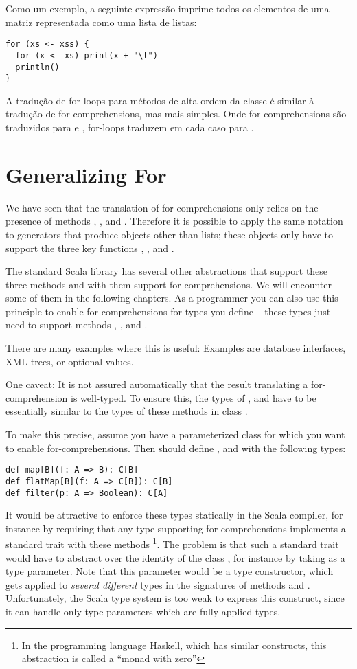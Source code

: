 Como um exemplo, a seguinte expressão imprime todos os elementos de uma matriz representada como 
uma lista de listas:
 \begin{lstlisting}
for (xs <- xss) {
  for (x <- xs) print(x + "\t")
  println()
}
\end{lstlisting}
A tradução de for-loops para métodos de alta ordem da classe  é similar à tradução de
for-comprehensions, mas mais simples. Onde for-comprehensions são traduzidos para  e 
, for-loops traduzem em cada caso para .

\section{Generalizing For}

We have seen that the translation of for-comprehensions only relies on
the presence of methods , , and
. Therefore it is possible to apply the same notation to
generators that produce objects other than lists; these objects only
have to support the three key functions , ,
and .

The standard Scala library has several other abstractions that support
these three methods and with them support for-comprehensions. We will
encounter some of them in the following chapters. As a programmer you
can also use this principle to enable for-comprehensions for types you
define -- these types just need to support methods ,
, and .

There are many examples where this is useful: Examples are database
interfaces, XML trees, or optional values. 

One caveat: It is not assured automatically that the result
translating a for-comprehension is well-typed. To ensure this, the
types of ,  and  have to be
essentially similar to the types of these methods in class .

To make this precise, assume you have a parameterized class
  for which you want to enable for-comprehensions. Then
  should define ,  and 
 with the following types:
\begin{lstlisting}
def map[B](f: A => B): C[B]
def flatMap[B](f: A => C[B]): C[B]
def filter(p: A => Boolean): C[A]
\end{lstlisting}
It would be attractive to enforce these types statically in the Scala
compiler, for instance by requiring that any type supporting
for-comprehensions implements a standard trait with these methods
\footnote{In the programming language Haskell, which has similar
constructs, this abstraction is called a ``monad with zero''}.  The
problem is that such a standard trait would have to abstract over the
identity of the class , for instance by taking  as a
type parameter.  Note that this parameter would be a type constructor,
which gets applied to {\em several different} types in the signatures of
methods  and . Unfortunately, the Scala type
system is too weak to express this construct, since it can handle only
type parameters which are fully applied types.

